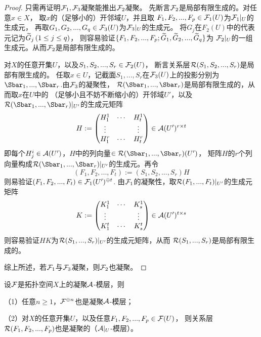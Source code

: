 \begin{proof}
  只需再证明$\mathcal{F}_1,\mathcal{F}_3$凝聚能推出$\mathcal{F}_2$凝聚。
先断言$\mathcal{F}_2$是局部有限生成的。对任意$x\in X$，
取$x$的（足够小的）开邻域$U$，并且取
$F_1,F_2,...,F_p\in\mathcal{F}_1(U)$为$\mathcal{F}_1|_U$的生成元，
再取$G_1,G_2,...,G_q\in\mathcal{F}_3(U)$为$\mathcal{F}_3|_U$的生成元。
将$G_j$在$F_2(U)$中的代表元记为$\widetilde{G}_j\,(1\leq j\leq q)$，
则容易验证$\{F_1,F_2,...,F_p;\widetilde{G}_1,\widetilde{G}_2,...,\widetilde{G}_q\}$为
$\mathcal{F}_2|_U$的一组生成元。从而$\mathcal{F}_2$是局部有限生成的。

对$X$的任意开集$U$，以及$S_1,S_2,...,S_r\in\mathcal{F}_2(U)$，
断言关系层$\mathcal{R}(S_1,S_2,...,S_r)$是局部有限生成的。
任取$x\in U$，记截面$S_1,...,S_r$在$\mathcal{F}_3(U)$上的投影分别为
$\Sbar_1,...,\Sbar_r$.由$\mathcal{F}_3$的凝聚性，
$\mcalR(\Sbar_1,...,\Sbar_r)$是局部有限生成的，从而取$x$在$U$中的
（足够小且不妨不断缩小的）开邻域$U'$，以及
$\mcalR(\Sbar_1,...,\Sbar_r)|_{U'}$的生成元矩阵
$$
   H
:=
  \begin{pmatrix}
    H_1^1  & \cdots & H_t^1 \\
    \vdots &        & \vdots\\
    H_1^r  & \cdots & H_t^r
  \end{pmatrix}
\in
  \mathcal{A}(U')^{r\times t}
$$
即每个$H_j^i\in\mathcal{A}(U')$，$H$中的列向量$\in\mcalR(\Sbar_1,...,\Sbar_r)(U')$，
矩阵$H$的$r$个列向量构成$\mcalR(\Sbar_1,...,\Sbar_r)|_{U'}$的生成元。再令
$$
  (F_1,F_2,...,F_t)
:=(S_1,S_2,...,S_r)H
$$
则易验证$(F_1,F_2,...,F_t)\in\mathcal{F}_1(U')^{\oplus t}$.
由$\mathcal{F}_1$的凝聚性，取$\mathcal{R}(F_1,...,F_t)|_{U'}$的生成元矩阵
$$
   K
:=
  \begin{pmatrix}
    K_1^1  & \cdots & K_s^1 \\
    \vdots &        & \vdots\\
    K_1^t  & \cdots & K_s^t
  \end{pmatrix}
\in
  \mathcal{A}(U')^{t\times s}
$$
则容易验证$HK$为$\mathcal{R}(S_1,...,S_r)|_{U'}$的生成元矩阵，从而
$\mathcal{R}(S_1,...,S_r)$是局部有限生成的。

综上所述，若$\mathcal{F}_1$与$\mathcal{F}_3$凝聚，则$\mathcal{F}_2$也凝聚。
\end{proof}

\begin{cor}设$\mathcal{F}$是拓扑空间$X$上的凝聚$\mathcal{A}$-模层，则

（1）任意$n\geq 1$，$\mathcal{F}^{\oplus n}$也是凝聚$\mathcal{A}$-模层；

（2）对$X$的任意开集$U$，以及任意$F_1,F_2,...,F_p\in\mathcal{F}(U)$，
则关系层$\mathcal{R}(F_1,F_2,...,F_p)$也是凝聚的（$\mathcal{A}|_U$-模层）。
\end{cor}

